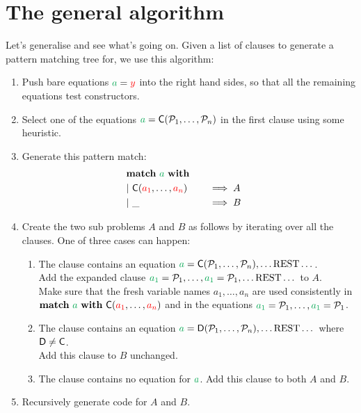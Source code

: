 \documentclass[a4paper, 11pt]{article}
\theoremstyle{definition}
\begin{document}
\section{The general algorithm}

Let's generalise and see what's going on. Given a list of clauses to generate a pattern matching tree for, we use this algorithm:

\begin{enumerate}
  \item Push bare equations $\ba = \fvar y$ into the right hand sides, so that all the remaining equations test constructors.
  \item Select one of the equations $\ba = \C(\pat_1, \dots, \pat_n)$ in the first clause using some heuristic.
  \item Generate this pattern match:
  \begin{alignat*}{4}
    \matchwith{\ba} \\
    \clause{\C(\fvar{a_1}, \dots, \fvar{a_n})}{A} \\
    \clause{\_}{B}
  \end{alignat*}
  \item Create the two sub problems $A$ and $B$ as follows by iterating over all the clauses. One of three cases can happen:
  \begin{enumerate}
    \item The clause contains an equation $\ba = \C(\pat_1, \dots, \pat_n), \dots \text{REST} \dots$. \\
          Add the expanded clause $\bvar{a_1} = \pat_1, \dots, \bvar{a_1} = \pat_1, \dots \text{REST} \dots$ to $A$. \\
          Make sure that the fresh variable names $a_1,\dots,a_n$ are used consistently in \\
          $\mathbf{match}\ \ba\ \mathbf{with}\ \C(\fvar{a_1}, \dots, \fvar{a_n})$ and in the equations $\bvar{a_1} = \pat_1, \dots, \bvar{a_1} = \pat_1$.
    \item The clause contains an equation $\ba = \mathsf{D}(\pat_1, \dots, \pat_n), \dots \text{REST} \dots$ where $\mathsf{D} \neq \mathsf{\textcolor{black}{C}}$. \\
          Add this clause to $B$ unchanged.
    \item The clause contains no equation for $\ba$. Add this clause to both $A$ and $B$.
  \end{enumerate}
  \item Recursively generate code for $A$ and $B$.
\end{enumerate}
\end{document}

